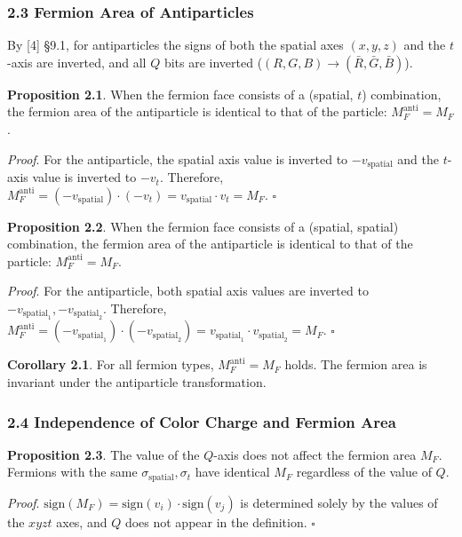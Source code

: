 \documentclass[
  a4paper,11pt]{article}
\begin{document}
\subsubsection{2.3 Fermion Area of
Antiparticles}\label{fermion-area-of-antiparticles}

By {[}4{]} §9.1, for antiparticles the signs of both the spatial axes
\((x, y, z)\) and the \(t\)-axis are inverted, and all \(Q\) bits are
inverted (\((R,G,B) \to (\bar{R},\bar{G},\bar{B})\)).

\textbf{Proposition 2.1}. When the fermion face consists of a (spatial,
\(t\)) combination, the fermion area of the antiparticle is identical to
that of the particle: \(M_F^{\text{anti}} = M_F\).

\emph{Proof}. For the antiparticle, the spatial axis value is inverted
to \(-v_{\text{spatial}}\) and the \(t\)-axis value is inverted to
\(-v_t\). Therefore,
\(M_F^{\text{anti}} = (-v_{\text{spatial}}) \cdot (-v_t) = v_{\text{spatial}} \cdot v_t = M_F\).
\(\square\)

\textbf{Proposition 2.2}. When the fermion face consists of a (spatial,
spatial) combination, the fermion area of the antiparticle is identical
to that of the particle: \(M_F^{\text{anti}} = M_F\).

\emph{Proof}. For the antiparticle, both spatial axis values are
inverted to \(-v_{\text{spatial}_1}, -v_{\text{spatial}_2}\). Therefore,
\(M_F^{\text{anti}} = (-v_{\text{spatial}_1}) \cdot (-v_{\text{spatial}_2}) = v_{\text{spatial}_1} \cdot v_{\text{spatial}_2} = M_F\).
\(\square\)

\textbf{Corollary 2.1}. For all fermion types,
\(M_F^{\text{anti}} = M_F\) holds. The fermion area is invariant under
the antiparticle transformation.

\subsubsection{2.4 Independence of Color Charge and Fermion
Area}\label{independence-of-color-charge-and-fermion-area}

\textbf{Proposition 2.3}. The value of the \(Q\)-axis does not affect
the fermion area \(M_F\). Fermions with the same
\(\sigma_{\text{spatial}}, \sigma_t\) have identical \(M_F\) regardless
of the value of \(Q\).

\emph{Proof}.
\(\text{sign}(M_F) = \text{sign}(v_i) \cdot \text{sign}(v_j)\) is
determined solely by the values of the \(xyzt\) axes, and \(Q\) does not
appear in the definition. \(\square\)
\end{document}
